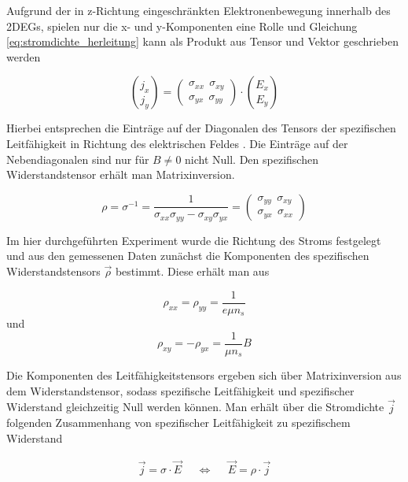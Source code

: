 Aufgrund der in z-Richtung eingeschränkten Elektronenbewegung innerhalb des 2DEGs, spielen nur die x- und y-Komponenten eine Rolle und Gleichung \ref{eq:stromdichte_herleitung} kann als Produkt aus Tensor und Vektor geschrieben werden

\begin{equation}
{j_x\choose j_y}=\begin{pmatrix}
\sigma_{xx} ~~ \sigma_{xy} \\ \sigma_{yx} ~~ \sigma_{yy}
\end{pmatrix} \cdot {E_x \choose E_y}
\label{eq:stromdichte_matrixdarst}
\end{equation}

Hierbei entsprechen die Einträge auf der Diagonalen des Tensors der spezifischen Leitfähigkeit in Richtung des elektrischen Feldes \cite[Kap.3.6]{kopitzki_einfuhrung_2009}. Die Einträge auf der Nebendiagonalen sind nur für $B\neq0$ nicht Null.
Den spezifischen Widerstandstensor erhält man Matrixinversion.

\begin{equation}
\rho=\sigma^{-1}=\frac{1}{\sigma_{xx}\sigma_{yy} - \sigma_{xy}\sigma_{yx}}=\begin{pmatrix}
\sigma_{yy} ~~ \sigma_{xy} \\ \sigma_{yx} ~~ \sigma_{xx}
\end{pmatrix}
\label{eq:widerstandstensor_matrixinversion}
\end{equation}

Im hier durchgeführten Experiment wurde die Richtung des Stroms festgelegt und aus den gemessenen Daten zunächst die Komponenten des spezifischen Widerstandstensors $\vec{\rho}$ bestimmt. 
Diese erhält man aus

\begin{equation}
\rho_{xx}=\rho_{yy}=\frac{1}{e\mu n_s}
\label{eq:widerst_tensor_xx_yy}
\end{equation}
und
\begin{equation}
\rho_{xy}=-\rho_{yx}=\frac{1}{\mu n_s}B
\label{eq:widerst_tensor_xy_yx}
\end{equation}

Die Komponenten des Leitfähigkeitstensors ergeben sich über Matrixinversion aus dem Widerstandstensor, sodass spezifische Leitfähigkeit und spezifischer Widerstand gleichzeitig Null werden können. Man erhält über die Stromdichte $\vec{j}$ folgenden Zusammenhang von spezifischer Leitfähigkeit zu spezifischem Widerstand

\begin{align}
	\vec{j} = \sigma \cdot \vec{E} & & \Leftrightarrow & & \vec{E} = \rho \cdot \vec{j}
	\label{eq:e2rho}
\end{align}


